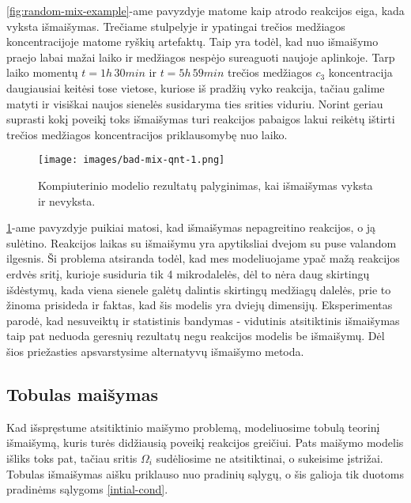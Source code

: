 \ref{fig:random-mix-example}-ame pavyzdyje matome kaip atrodo reakcijos eiga, kada vyksta išmaišymas. Trečiame stulpelyje ir ypatingai trečios medžiagos koncentracijoje matome ryškių artefaktų. Taip yra todėl, kad nuo išmaišymo praejo labai mažai laiko ir medžiagos nespėjo sureaguoti naujoje aplinkoje. Tarp laiko momentų $t=1h\,30min$ ir $t=5h\,59min$ trečios medžiagos $c_3$ koncentracija daugiausiai keitėsi tose vietose, kuriose iš pradžių vyko reakcija, tačiau galime matyti ir visiškai naujos sienelės susidaryma ties srities viduriu. Norint geriau suprasti kokį poveikį toks išmaišymas turi reakcijos pabaigos lakui reikėtų ištirti trečios medžiagos koncentracijos priklausomybę nuo laiko.

\newpage
\begin{figure}[h!]
    \centering
    \texttt{[image: images/bad-mix-qnt-1.png]}
    \caption{Kompiuterinio modelio rezultatų palyginimas, kai išmaišymas vyksta ir nevyksta.  }
    \label{bad-mix-qnt-example}
\end{figure}
\ref{bad-mix-qnt-example}-ame pavyzdyje puikiai matosi, kad išmaišymas nepagreitino reakcijos, o ją sulėtino. Reakcijos laikas su išmaišymu yra apytiksliai dvejom su puse valandom ilgesnis. Ši problema atsiranda todėl, kad mes modeliuojame ypač mažą reakcijos erdvės sritį, kurioje susiduria tik 4 mikrodalelės, dėl to nėra daug skirtingų išdėstymų, kada viena sienele galėtų dalintis skirtingų medžiagų dalelės, prie to žinoma prisideda ir faktas, kad šis modelis yra dviejų dimensijų. Eksperimentas parodė, kad nesuveiktų ir statistinis bandymas - vidutinis atsitiktinis išmaišymas taip pat neduoda geresnių rezultatų negu reakcijos modelis be išmaišymų. Dėl šios priežasties apsvarstysime alternatyvų išmaišymo metoda.

\subsection{Tobulas maišymas}

Kad išspręstume atsitiktinio maišymo problemą, modeliuosime tobulą teorinį išmaišymą, kuris turės didžiausią poveikį reakcijos greičiui. Pats maišymo modelis išliks toks pat, tačiau sritis $\Omega_i$ sudėliosime ne atsitiktinai, o sukeisime įstrižai. Tobulas išmaišymas aišku priklauso nuo pradinių sąlygų, o šis galioja tik duotoms pradinėms sąlygoms \eqref{intial-cond}.

